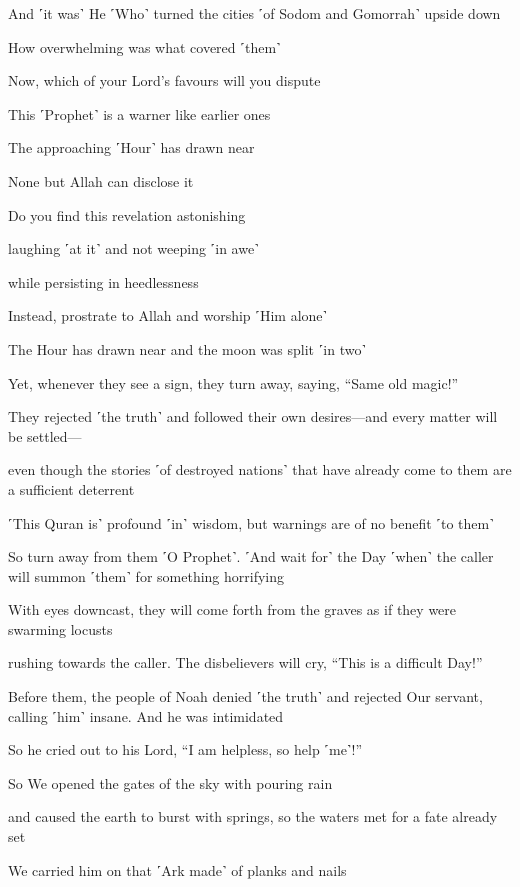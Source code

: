 And ˹it was˺ He ˹Who˺ turned the cities ˹of Sodom and Gomorrah˺ upside down

How overwhelming was what covered ˹them˺

Now, which of your Lord’s favours will you dispute

This ˹Prophet˺ is a warner like earlier ones

The approaching ˹Hour˺ has drawn near

None but Allah can disclose it

Do you find this revelation astonishing

laughing ˹at it˺ and not weeping ˹in awe˺

while persisting in heedlessness

Instead, prostrate to Allah and worship ˹Him alone˺

The Hour has drawn near and the moon was split ˹in two˺

Yet, whenever they see a sign, they turn away, saying, “Same old magic!”

They rejected ˹the truth˺ and followed their own desires—and every matter will be settled—

even though the stories ˹of destroyed nations˺ that have already come to them are a sufficient deterrent

˹This Quran is˺ profound ˹in˺ wisdom, but warnings are of no benefit ˹to them˺

So turn away from them ˹O Prophet˺. ˹And wait for˺ the Day ˹when˺ the caller will summon ˹them˺ for something horrifying

With eyes downcast, they will come forth from the graves as if they were swarming locusts

rushing towards the caller. The disbelievers will cry, “This is a difficult Day!”

Before them, the people of Noah denied ˹the truth˺ and rejected Our servant, calling ˹him˺ insane. And he was intimidated

So he cried out to his Lord, “I am helpless, so help ˹me˺!”

So We opened the gates of the sky with pouring rain

and caused the earth to burst with springs, so the waters met for a fate already set

We carried him on that ˹Ark made˺ of planks and nails

